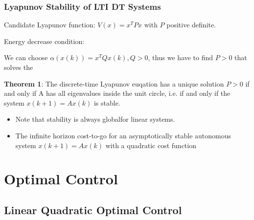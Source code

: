 \documentclass[8pt,a4paper]{scrartcl}
\begin{document}
\begin{multicols*}{3}
\subsubsection{Lyapunov Stability of LTI DT Systems}


Candidate Lyapunov function: $V(x)=x^TPx$ with $P$ positive definite.

\finn

Energy decrease condition:


We can choose $\alpha(x(k))=x^TQx(k),Q>0$, thus we have to find $P>0$ that solves the


\textbf{Theorem 1}: The discrete-time Lyapunov euqation has a unique solution $P>0$ if and only if A has all eigenvalues inside the unit circle, i.e. if and only if the system $x(k+1)=Ax(k)$ is stable.

\begin{itemize}
\item Note that stability is always \glqq global\grqq  for linear systems.
\item The infinite horizon cost-to-go for an asymptotically stable autonomous system $x(k+1)=Ax(k)$ with a quadratic cost function
\end{itemize}


\section{Optimal Control}



\subsection{Linear Quadratic Optimal Control}


\end{multicols*}
\end{document}
